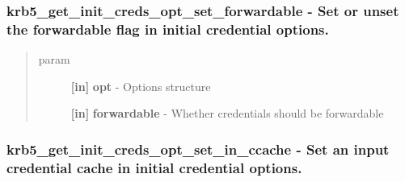 \documentclass[letterpaper,10pt,english]{sphinxmanual}
\begin{document}
\subsubsection{krb5\_get\_init\_creds\_opt\_set\_forwardable -  Set or unset the forwardable flag in initial credential options.}
\label{appdev/refs/api/krb5_get_init_creds_opt_set_forwardable:krb5-get-init-creds-opt-set-forwardable-set-or-unset-the-forwardable-flag-in-initial-credential-options}\label{appdev/refs/api/krb5_get_init_creds_opt_set_forwardable::doc}

\begin{fulllineitems}
\label{appdev/refs/api/krb5_get_init_creds_opt_set_forwardable:krb5_get_init_creds_opt_set_forwardable}
\end{fulllineitems}

\begin{quote}\begin{description}
\item[{param}] \leavevmode
\textbf{{[}in{]}} \textbf{opt} - Options structure

\textbf{{[}in{]}} \textbf{forwardable} - Whether credentials should be forwardable

\end{description}\end{quote}


\subsubsection{krb5\_get\_init\_creds\_opt\_set\_in\_ccache -  Set an input credential cache in initial credential options.}
\label{appdev/refs/api/krb5_get_init_creds_opt_set_in_ccache::doc}\label{appdev/refs/api/krb5_get_init_creds_opt_set_in_ccache:krb5-get-init-creds-opt-set-in-ccache-set-an-input-credential-cache-in-initial-credential-options}

\begin{fulllineitems}
\label{appdev/refs/api/krb5_get_init_creds_opt_set_in_ccache:krb5_get_init_creds_opt_set_in_ccache}
\end{fulllineitems}
\end{document}
